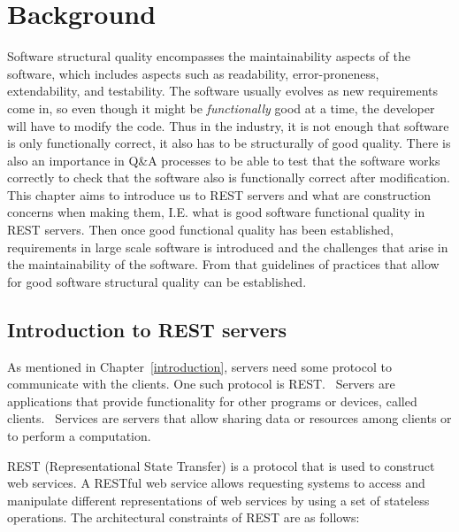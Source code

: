 \chapter{Background}\label{background}

Software structural quality encompasses the maintainability aspects of the
software, which includes aspects such as readability, error-proneness,
extendability, and testability. The software usually evolves as new
requirements come in, so even though it might be \textit{functionally} good at
a time, the developer will have to modify the code. Thus in the industry, it is
not enough that software is only functionally correct, it also has to be
structurally of good quality. There is also an importance in Q\&A processes to
be able to test that the software works correctly to check that the software
also is functionally correct after modification. This chapter aims to introduce
us to REST servers and what are construction concerns when making them, I.E.
what is good software functional quality in REST servers. Then once good
functional quality has been established, requirements in large scale software
is introduced and the challenges that arise in the maintainability of the
software. From that guidelines of practices that allow for good software
structural quality can be established.

\section{Introduction to REST servers}

As mentioned in Chapter~\ref{introduction}, servers need some protocol to
communicate with the clients. One such protocol is
REST.~\cite{Fielding:2000:ASD:932295} Servers are applications that provide
functionality for other programs or devices, called
clients.~\cite{Fielding:2000:ASD:932295} Services are servers that allow sharing
data or resources among clients or to perform a computation.

REST (Representational State Transfer) is a protocol that is used to construct
web services. A RESTful web service allows requesting systems to access
and manipulate different representations of web services by using a set of
stateless operations. The architectural constraints of REST are as follows:

